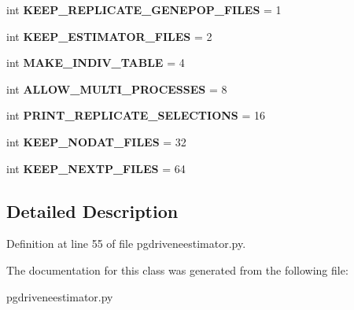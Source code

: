 \begin{DoxyCompactItemize}
\item 
int {\bfseries K\+E\+E\+P\+\_\+\+R\+E\+P\+L\+I\+C\+A\+T\+E\+\_\+\+G\+E\+N\+E\+P\+O\+P\+\_\+\+F\+I\+L\+ES} = 1\hypertarget{classnegui_1_1pgdriveneestimator_1_1DebugMode_a28d1c7693a4bec8f391bef360d51b463}{}\label{classnegui_1_1pgdriveneestimator_1_1DebugMode_a28d1c7693a4bec8f391bef360d51b463}

\item 
int {\bfseries K\+E\+E\+P\+\_\+\+E\+S\+T\+I\+M\+A\+T\+O\+R\+\_\+\+F\+I\+L\+ES} = 2\hypertarget{classnegui_1_1pgdriveneestimator_1_1DebugMode_a2f02d51f5d3a4a6c9cfaa8d0f6ea1879}{}\label{classnegui_1_1pgdriveneestimator_1_1DebugMode_a2f02d51f5d3a4a6c9cfaa8d0f6ea1879}

\item 
int {\bfseries M\+A\+K\+E\+\_\+\+I\+N\+D\+I\+V\+\_\+\+T\+A\+B\+LE} = 4\hypertarget{classnegui_1_1pgdriveneestimator_1_1DebugMode_a1f5d7e71208d6a4a9d7a63b0207e1ab8}{}\label{classnegui_1_1pgdriveneestimator_1_1DebugMode_a1f5d7e71208d6a4a9d7a63b0207e1ab8}

\item 
int {\bfseries A\+L\+L\+O\+W\+\_\+\+M\+U\+L\+T\+I\+\_\+\+P\+R\+O\+C\+E\+S\+S\+ES} = 8\hypertarget{classnegui_1_1pgdriveneestimator_1_1DebugMode_af0b037fef1711a912d1f83ed61f57097}{}\label{classnegui_1_1pgdriveneestimator_1_1DebugMode_af0b037fef1711a912d1f83ed61f57097}

\item 
int {\bfseries P\+R\+I\+N\+T\+\_\+\+R\+E\+P\+L\+I\+C\+A\+T\+E\+\_\+\+S\+E\+L\+E\+C\+T\+I\+O\+NS} = 16\hypertarget{classnegui_1_1pgdriveneestimator_1_1DebugMode_a238432e744ac313e2ce4d7de801ffe92}{}\label{classnegui_1_1pgdriveneestimator_1_1DebugMode_a238432e744ac313e2ce4d7de801ffe92}

\item 
int {\bfseries K\+E\+E\+P\+\_\+\+N\+O\+D\+A\+T\+\_\+\+F\+I\+L\+ES} = 32\hypertarget{classnegui_1_1pgdriveneestimator_1_1DebugMode_ac55e866ab4d12b084f2480d625c9dbb8}{}\label{classnegui_1_1pgdriveneestimator_1_1DebugMode_ac55e866ab4d12b084f2480d625c9dbb8}

\item 
int {\bfseries K\+E\+E\+P\+\_\+\+N\+E\+X\+T\+P\+\_\+\+F\+I\+L\+ES} = 64\hypertarget{classnegui_1_1pgdriveneestimator_1_1DebugMode_a13096a90911741639b1eea0e1595cb2b}{}\label{classnegui_1_1pgdriveneestimator_1_1DebugMode_a13096a90911741639b1eea0e1595cb2b}

\end{DoxyCompactItemize}


\subsection{Detailed Description}


Definition at line 55 of file pgdriveneestimator.\+py.



The documentation for this class was generated from the following file\+:\begin{DoxyCompactItemize}
\item 
pgdriveneestimator.\+py\end{DoxyCompactItemize}

